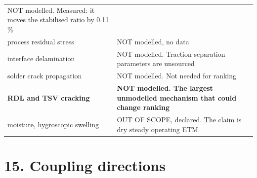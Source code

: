 \documentclass[10pt,]{article}
\begin{document}
\begin{longtable}[]{@{}ll@{}}
\begin{minipage}[t]{0.47\columnwidth}
NOT modelled. Measured: it moves the stabilised ratio by 0.11 \%\strut
\end{minipage}\tabularnewline
\begin{minipage}[t]{0.47\columnwidth}\raggedright
process residual stress\strut
\end{minipage} & \begin{minipage}[t]{0.47\columnwidth}\raggedright
NOT modelled, no data\strut
\end{minipage}\tabularnewline
\begin{minipage}[t]{0.47\columnwidth}\raggedright
interface delamination\strut
\end{minipage} & \begin{minipage}[t]{0.47\columnwidth}\raggedright
NOT modelled. Traction-separation parameters are unsourced\strut
\end{minipage}\tabularnewline
\begin{minipage}[t]{0.47\columnwidth}\raggedright
solder crack propagation\strut
\end{minipage} & \begin{minipage}[t]{0.47\columnwidth}\raggedright
NOT modelled. Not needed for ranking\strut
\end{minipage}\tabularnewline
\begin{minipage}[t]{0.47\columnwidth}\raggedright
\textbf{RDL and TSV cracking}\strut
\end{minipage} & \begin{minipage}[t]{0.47\columnwidth}\raggedright
\textbf{NOT modelled. The largest unmodelled mechanism that could change
ranking}\strut
\end{minipage}\tabularnewline
\begin{minipage}[t]{0.47\columnwidth}\raggedright
moisture, hygroscopic swelling\strut
\end{minipage} & \begin{minipage}[t]{0.47\columnwidth}\raggedright
OUT OF SCOPE, declared. The claim is dry steady operating ETM\strut
\end{minipage}\tabularnewline
\bottomrule
\end{longtable}

\newpage

\hypertarget{coupling-directions}{%
\section{15. Coupling directions}\label{coupling-directions}}
\end{document}
